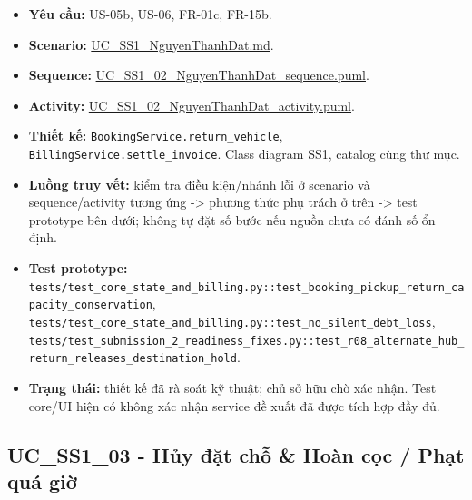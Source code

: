 \documentclass[11pt,a4paper]{article}
\providecommand{\tightlist}{%
  \setlength{\itemsep}{0pt}\setlength{\parskip}{0pt}}
\begin{document}
\begin{itemize}
\tightlist
\item
  \textbf{Yêu cầu:} US-05b, US-06, FR-01c, FR-15b.
\item
  \textbf{Scenario:}
  \href{../../../../docs/diagrams/Use-case\%20detail-scenario/SS1/Usecase\%20scenario/UC_SS1_NguyenThanhDat.md}{UC\_SS1\_NguyenThanhDat.md}.
\item
  \textbf{Sequence:}
  \href{../../../../docs/diagrams/Use-case\%20detail-scenario/SS1/Sequence\%20diagrams/UC_SS1_02_NguyenThanhDat_sequence.puml}{UC\_SS1\_02\_NguyenThanhDat\_sequence.puml}.
\item
  \textbf{Activity:}
  \href{../../../../docs/diagrams/Use-case\%20detail-scenario/SS1/Activity\%20diagrams/UC_SS1_02_NguyenThanhDat_activity.puml}{UC\_SS1\_02\_NguyenThanhDat\_activity.puml}.
\item
  \textbf{Thiết kế:} \texttt{BookingService.return\_vehicle},
  \texttt{BillingService.settle\_invoice}. Class diagram SS1, catalog
  cùng thư mục.
\item
  \textbf{Luồng truy vết:} kiểm tra điều kiện/nhánh lỗi ở scenario và
  sequence/activity tương ứng -\textgreater{} phương thức phụ trách ở
  trên -\textgreater{} test prototype bên dưới; không tự đặt số bước nếu
  nguồn chưa có đánh số ổn định.
\item
  \textbf{Test prototype:}
  \texttt{tests/test\_core\_state\_and\_billing.py::test\_booking\_pickup\_return\_capacity\_conservation},
  \texttt{tests/test\_core\_state\_and\_billing.py::test\_no\_silent\_debt\_loss},
  \texttt{tests/test\_submission\_2\_readiness\_fixes.py::test\_r08\_alternate\_hub\_return\_releases\_destination\_hold}.
\item
  \textbf{Trạng thái:} thiết kế đã rà soát kỹ thuật; chủ sở hữu chờ xác
  nhận. Test core/UI hiện có không xác nhận service đề xuất đã được tích
  hợp đầy đủ.
\end{itemize}

\hypertarget{uc_ss1_03---hux1ee7y-ux111ux1eb7t-chux1ed7-houxe0n-cux1ecdc-phux1ea1t-quuxe1-giux1edd}{%
\subsection{UC\_SS1\_03 - Hủy đặt chỗ \& Hoàn cọc / Phạt quá
giờ}\label{uc_ss1_03---hux1ee7y-ux111ux1eb7t-chux1ed7-houxe0n-cux1ecdc-phux1ea1t-quuxe1-giux1edd}}
\end{document}
